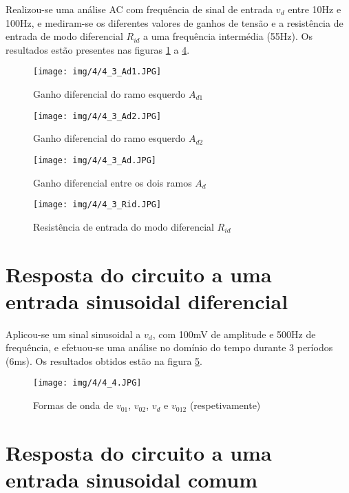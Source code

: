 \documentclass[a4paper,2pt]{report}
\begin{document}
\par Realizou-se uma análise AC com frequência de sinal de entrada \(v_d\) entre 10Hz e 100Hz, e mediram-se os diferentes valores de ganhos de tensão e a resistência de entrada de modo diferencial \(R_{id}\) a uma frequência intermédia (55Hz). Os resultados estão presentes nas figuras \ref{4_3_ad1} a \ref{4_3_rid}.

\begin{figure}[H]
    \centering
    \texttt{[image: img/4/4\_3\_Ad1.JPG]}
    \caption{Ganho diferencial do ramo esquerdo \(A_{d1}\)}
    \label{4_3_ad1}
\end{figure}
\begin{figure}[H]
    \centering
    \texttt{[image: img/4/4\_3\_Ad2.JPG]}
    \caption{Ganho diferencial do ramo esquerdo \(A_{d2}\)}
    \label{4_3_ad2}
\end{figure}
\begin{figure}[H]
    \centering
    \texttt{[image: img/4/4\_3\_Ad.JPG]}
    \caption{Ganho diferencial entre os dois ramos \(A_d\)}
    \label{4_3_ad}
\end{figure}
\begin{figure}[H]
    \centering
    \texttt{[image: img/4/4\_3\_Rid.JPG]}
    \caption{Resistência de entrada do modo diferencial \(R_{id}\)}
    \label{4_3_rid}
\end{figure}

\section{Resposta do circuito a uma entrada sinusoidal diferencial}

\par Aplicou-se um sinal sinusoidal a \(v_d\), com 100mV de amplitude e 500Hz de frequência, e efetuou-se uma análise no domínio do tempo durante 3 períodos (6ms). Os resultados obtidos estão na figura \ref{4_4}.

\begin{figure}[H]
    \centering
    \texttt{[image: img/4/4\_4.JPG]}
    \caption{Formas de onda de \(v_{01}\), \(v_{02}\), \(v_{d}\) e \(v_{012}\) (respetivamente)}
    \label{4_4}
\end{figure}

\section{Resposta do circuito a uma entrada sinusoidal comum}
\end{document}
